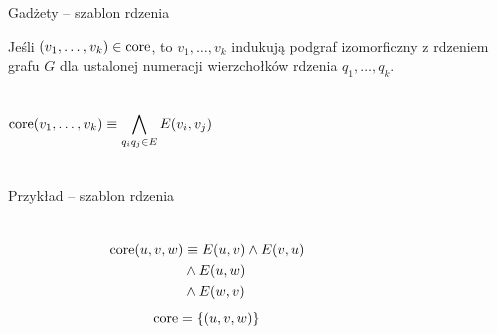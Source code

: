 
\begin{frame}{Gadżety -- szablon rdzenia}

    Jeśli \((v_1, \dots, v_k) \in \text{core}\), to \(v_1, \dots, v_k\) indukują podgraf izomorficzny z rdzeniem grafu \(G\) \linebreak dla ustalonej numeracji wierzchołków rdzenia \(q_1,\dots,q_k\).

\vspace{1.5em}
\begin{columns}
    \[ \text{core}(v_1,\dots,v_k) \equiv \bigwedge_{q_i q_j \in E} E(v_i,v_j) \]

    
\end{columns}

\end{frame}




\begin{frame}{Przykład -- szablon rdzenia}

\begin{columns}
    \begin{figure}
        \centering
        
    \end{figure}

    \begin{align*}
        \text{core}(u,v,w)&\equiv E(u,v) \land E(v,u) \\
        &\land E(u,w) \\ 
        &\land E(w,v)
    \end{align*}
    \[ \text{core} = \left\{ (u,v,w) \right\} \]
\end{columns}

\vspace{1em}

\end{frame}


